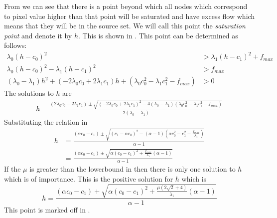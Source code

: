 \begin{definition} From  we can see that there is a point beyond which all nodes which correspond to pixel value higher than that point will be saturated and have excess flow which means that they will be in the source set. We will call this point the \textit{saturation point} and denote it by $h$. This is shown in . This point can be determined as follows:
\begin{equation*}\begin{split}
	\lambda_0(h-c_0)^2 &> \lambda_1(h-c_1)^2 + f_{max} \\
	\lambda_0(h-c_0)^2 - \lambda_1(h-c_1)^2 &> f_{max} \\
	(\lambda_0-\lambda_1)h^2 + (-2\lambda_0 c_0 + 2\lambda_1 c_1)h + (\lambda_0 c_0^2 - \lambda_1 c_1^2-f_{max}) &> 0
\end{split}\end{equation*}
The solutions to $h$ are
\begin{equation*}\begin{split}
	h = \frac{ (2\lambda_0 c_0 - 2\lambda_1 c_1) \pm \sqrt{(-2\lambda_0 c_0 + 2\lambda_1 c_1)^2-4(\lambda_0-\lambda_1)(\lambda_0 c_0^2 - \lambda_1 c_1^2-f_{max})}}{2(\lambda_0-\lambda_1)}
\end{split}\end{equation*}
Substituting the relation in 
\begin{equation*}\begin{split}
	h &= \frac{(\alpha c_0-c_1)\pm\sqrt{(c_1-\alpha c_0)^2-(\alpha-1)(\alpha c_0^2-c_1^2-\frac{f_{max}}{\lambda_1})}}{\alpha-1}\\
	&= \frac{(\alpha c_0-c_1)\pm\sqrt{\alpha(c_0-c_1)^2+\frac{f_{max}}{\lambda_1}(\alpha-1)}}{\alpha-1}
\end{split}\end{equation*}
If the $\mu$ is greater than the lowerbound in  then there is only one solution to $h$ which is of importance. This is the positive solution for $h$ which is
\begin{equation}
	h = \frac{(\alpha c_0-c_1)+\sqrt{\alpha(c_0-c_1)^2+\frac{\mu(2\sqrt{2}+4)}{\lambda_1}(\alpha-1)}}{\alpha-1}
	\label{eq:h}
\end{equation}
This point is marked off in .
\end{definition}


